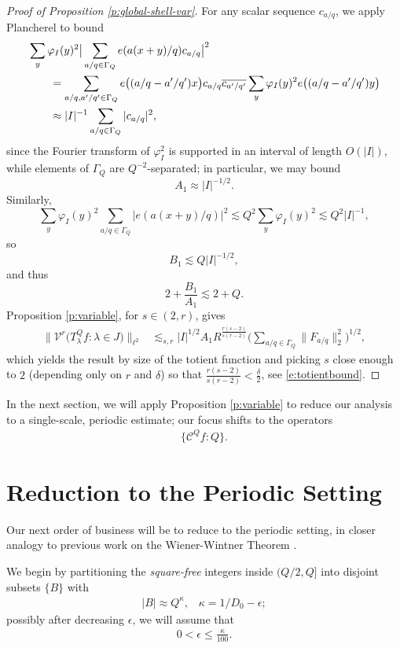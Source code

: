 \documentclass[12pt]{amsart}
\numberwithin{equation}{section}
\theoremstyle{definition}
\begin{document}
\begin{proof}[Proof of Proposition \ref{p:global-shell-var}]
For any scalar sequence \(c_{a/q}\), we apply Plancherel to bound
\begin{align}
    &\sum_y\varphi_I(y)^2
    \big|
    \sum_{a/q\in\Gamma_Q}e(a(x+y)/q)c_{a/q}
    \big|^2
    \notag\\
    &\qquad=
    \sum_{a/q,a'/q'\in\Gamma_Q}
    e\big((a/q-a'/q')x\big)c_{a/q}\overline{c_{a'/q'}}
    \sum_y\varphi_I(y)^2e\big((a/q-a'/q')y\big) \\
    & \qquad \approx |I|^{-1} \sum_{a/q \in \Gamma_Q} |c_{a/q}|^2,
\end{align}
since the Fourier transform of \(\varphi_I^2\) is supported in an interval of length
\(O(|I|)\), while elements of \(\Gamma_Q\) are \(Q^{-2}\)-separated; in particular, we may bound
\[
    A_1\approx |I|^{-1/2}.
\]
Similarly,
\[
    \sum_y\varphi_I(y)^2
    \sum_{a/q\in\Gamma_Q}|e(a(x+y)/q)|^2 \lesssim Q^2 \sum_y \varphi_I(y)^2 \lesssim
    Q^2 |I|^{-1},
\]
so
\[
    B_1\lesssim Q |I|^{-1/2},
\]and thus
\[
    2+\frac{B_1}{A_1}
    \lesssim
    2+Q.
\]
Proposition \ref{p:variable}, for $s \in (2,r)$, gives
\begin{align}
    \Big\|
    \mathcal{V}^r\big(T_\lambda^Q f:\lambda\in J\big)
    \Big\|_{\ell^2}
    &\lesssim_{s,r} |I|^{1/2} A_1R^{\frac{r(s-2)}{s(r-2)}}   \big(\sum_{a/q\in\Gamma_Q}\|F_{a/q}\|_2^2\big)^{1/2},
\end{align}
which yields the result by size of the totient function and picking $s$ close enough to $2$ (depending only on $r$ and $\delta$) so that $ \frac{r(s-2)}{s(r-2)}<\frac{\delta}{2}$, see \eqref{e:totientbound}.
\end{proof}


In the next section, we will apply Proposition \ref{p:variable} to reduce our analysis to a single-scale, periodic estimate; our focus shifts to the operators
\begin{align}
    \{ \mathcal{C}^Q f : Q \}.
\end{align}

\section{Reduction to the Periodic Setting}\label{s:per}
Our next order of business will be to reduce to the periodic setting, in closer analogy to previous work on the Wiener-Wintner Theorem \cite{F+}.

We begin by partitioning the \emph{square-free} integers inside $(Q/2,Q]$ into disjoint subsets $\{ B \}$ with
\begin{align}\label{e:kappa}
    |B| \approx Q^\kappa, \; \; \; \kappa = 1/D_0 - \epsilon;
\end{align}
possibly after decreasing $\epsilon$, we will assume that
\begin{align}\label{e:epskappa} 0 < \epsilon \leq \frac{\kappa}{100}.
\end{align}
\end{document}

